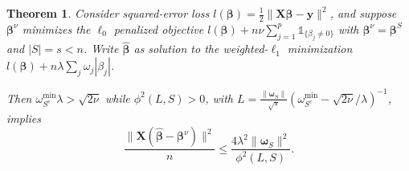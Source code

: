 \documentclass[12pt]{article}
\newtheorem{theorem}{\sc Theorem}[section]
\newcommand{\bs}[1]{\boldsymbol{#1}}
\newcommand{\mr}[1]{\mathrm{#1}}
\newcommand{\bm}[1]{\mathbf{#1}}
\newcommand{\ds}[1]{\mathds{#1}}
\begin{document}
\begin{theorem} \label{thm:sparseapprox}  Consider squared-error loss
$l(\bs{\beta}) =
\frac{1}{2}\|\bm{X}\bs{\beta}-\bm{y}\|^2$, and suppose $\bs{\beta}^{\nu}$ minimizes the $\ell_0$ penalized objective $l(\bs{\beta}) + n\nu\sum_{j=1}^p\ds{1}_{\{\beta_j\neq0\}}$ with $\bs{\beta}^\nu = \bs{\beta}^S$ and $|S|=s<n$.   
Write $\bs{\hat\beta}$ as solution to the weighted-$\ell_1$ minimization $l(\bs{\beta}) + n\lambda\sum_j\omega_j|\beta_j|$. 

Then  
$\omega^{\mr{min}}_{S^c}\lambda > \sqrt{2\nu}$ while $\phi^2(L,S) > 0$, with 
 $L = \frac{\|\bs{\omega}_S\|}{\sqrt{s}}\left(\omega^{\mr{min}}_{S^c}-\sqrt{2\nu}/\lambda\right)^{-1}$, implies
\begin{equation} \label{sparseineq}
\frac{\|\bm{X}(\bs{\hat\beta}-\bs{\beta}^\nu)\|^2}{n}\leq
\frac{4\lambda^2 \|\bs{\omega}_S\|^2}{\phi^2(L, S)}.
\end{equation} 
\end{theorem}
\end{document}
